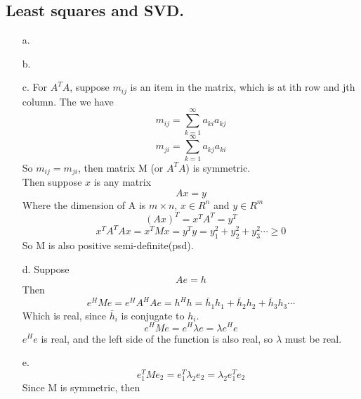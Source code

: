 \documentclass[10pt]{article}
\begin{document}
\subsection{Least squares and SVD.}
\begin{enumerate}
\item[a.]
\item[b.]
\item[c.]
For $A^TA$, suppose $m_{ij}$ is an item in the matrix, which is at ith row and jth column. The we have \\
\begin{equation}
m_{ij}=\sum_{k=1}^{\infty}a_{ki}a_{kj}
\end{equation}
\begin{equation}
m_{ji}=\sum_{k=1}^{\infty}a_{kj}a_{ki}
\end{equation}
So $m_{ij}=m_{ji}$, then matrix M (or $A^TA$) is symmetric.\\
Then suppose $x$ is any matrix \\
\begin{equation}
Ax=y
\end{equation}
Where the dimension of A is $m\times n$, $x\in R^n$ and $y\in R^m$
\begin{equation}
(Ax)^T=x^TA^T=y^T
\end{equation}
\begin{equation}
x^TA^TAx=x^TMx=y^Ty=y_1^2+y_2^2+y_3^2\dotsm\geqslant 0
\end{equation}
So M is also positive semi-definite(psd).
\item[d.]
Suppose \\
\begin{equation}
Ae=h
\end{equation}
Then \\
\begin{equation}
e^HMe=e^HA^HAe=h^Hh=\bar{h}_1h_1+\bar{h}_2h_2+\bar{h}_3h_3\dotsm
\end{equation}
Which is real, since $\bar{h}_i$ is conjugate to $h_i$.
\begin{equation}
e^HMe=e^H\lambda e=\lambda e^He
\end{equation}
$e^He$ is real, and the left side of the function is also real, so $\lambda$ must be real.
\item[e.] 
\begin{equation}
e_1^TMe_2=e_1^T\lambda_2e_2=\lambda_2 e_1^Te_2
\end{equation}
Since M is symmetric, then \\
\begin{equation}

\end{equation}
\end{enumerate}
\end{document}
